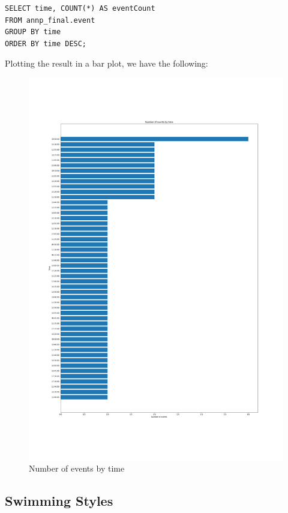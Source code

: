 \begin{verbatim}
SELECT time, COUNT(*) AS eventCount
FROM annp_final.event
GROUP BY time
ORDER BY time DESC;
\end{verbatim}

Plotting the result in a bar plot, we have the following:

\begin{figure}[H]
    \centering
    \includegraphics[width=\textwidth]{img/eventsbytime}
    \caption{Number of events by time}
    \label{fig:events-by-time}
\end{figure}

\subsection{Swimming Styles}

